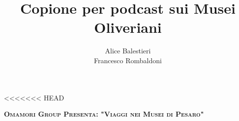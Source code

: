 \documentclass[hidelinks,12pt,a4paper]{article}
\begin{document}
	\begin{flushleft}
		
		\title{\textbf{Copione per podcast sui Musei Oliveriani}}
		\author{Alice Balestieri\\Francesco Rombaldoni}
		\date{}
		
<<<<<<< HEAD
		\item {\scshape\bfseries Omamori Group Presenta: "Viaggi nei Musei di Pesaro"\\}
		

\end{flushleft}
\end{document}
